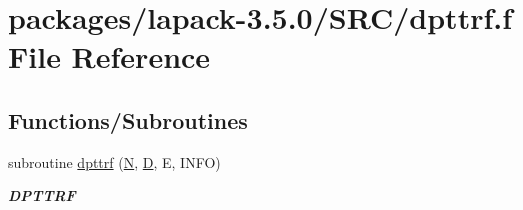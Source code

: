 \hypertarget{dpttrf_8f}{}\section{packages/lapack-\/3.5.0/\+S\+R\+C/dpttrf.f File Reference}
\label{dpttrf_8f}
\subsection*{Functions/\+Subroutines}
\begin{DoxyCompactItemize}
\item 
subroutine \hyperlink{group__doublePTcomputational_gad408508a4fb3810c23125995dc83ccc1}{dpttrf} (\hyperlink{polmisc_8c_a0240ac851181b84ac374872dc5434ee4}{N}, \hyperlink{odrpack_8h_a7dae6ea403d00f3687f24a874e67d139}{D}, E, I\+N\+F\+O)
\begin{DoxyCompactList}\small\item\em {\bfseries D\+P\+T\+T\+R\+F} \end{DoxyCompactList}\end{DoxyCompactItemize}
